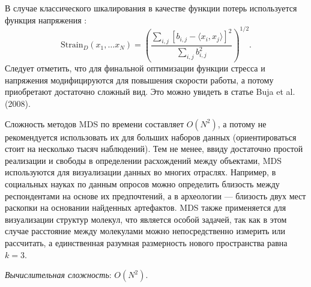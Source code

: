\documentclass[10pt, a4paper]{extarticle}
\begin{document}
В случае классического шкалирования в качестве функции потерь используется функция напряжения \cite{buja2008data}:
\[
\text{Strain}_D(x_1, \ldots x_N) = \left( \dfrac{\sum_{i, j}[b_{i, j} - \langle x_i, x_j\rangle]^2}{\sum_{i, j}b_{i, j}^2} \right)^{1/2}.
\]
Следует отметить, что для финальной оптимизации функции стресса и напряжения модифицируются для повышения скорости работы, а потому приобретают достаточно сложный вид. Это можно увидеть в статье Buja et al. (2008).

Сложность методов MDS по времени составляет $O(N^2)$, а потому не рекомендуется использовать их для больших наборов данных (ориентироваться стоит на несколько тысяч наблюдений). Тем не менее, ввиду достаточно простой реализации и свободы в определении расхождений между объектами, MDS используются для визуализации данных во многих отраслях. Например, в социальных науках по данным опросов можно определить близость между респондентами на основе их предпочтений, а в археологии — близость двух мест раскопки на основании найденных артефактов. MDS также применяется для визуализации структур молекул, что является особой задачей, так как в этом случае расстояние между молекулами можно непосредственно измерить или рассчитать, а единственная разумная размерность нового пространства равна $k = 3$.

\textit{Вычислительная сложность}: $O(N^2)$.
\end{document}
